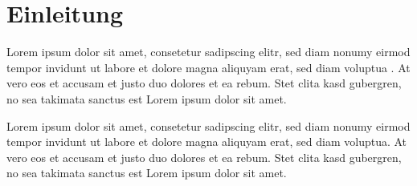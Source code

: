 %
%
%
\section{Einleitung\label{steps:section:einleitung}}
Lorem ipsum dolor sit amet, consetetur sadipscing elitr, sed diam
nonumy eirmod tempor invidunt ut labore et dolore magna aliquyam
erat, sed diam voluptua \cite{steps:bibtex}.
At vero eos et accusam et justo duo dolores et ea rebum.
Stet clita kasd gubergren, no sea takimata sanctus est Lorem ipsum
dolor sit amet.

Lorem ipsum dolor sit amet, consetetur sadipscing elitr, sed diam
nonumy eirmod tempor invidunt ut labore et dolore magna aliquyam
erat, sed diam voluptua.
At vero eos et accusam et justo duo dolores et ea rebum.  Stet clita
kasd gubergren, no sea takimata sanctus est Lorem ipsum dolor sit
amet.


